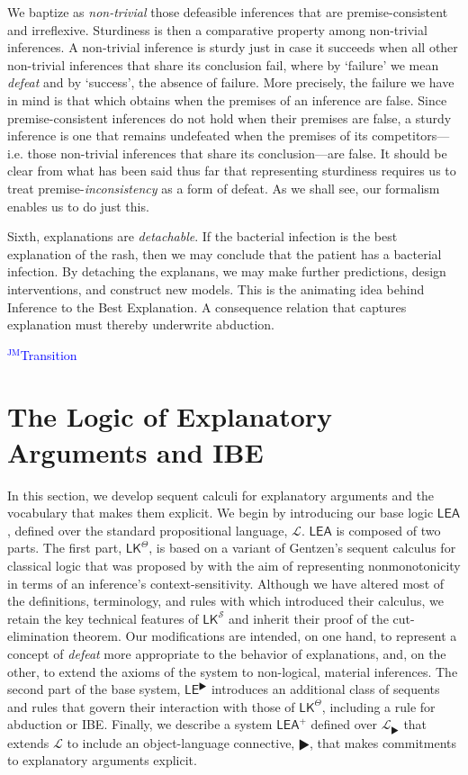 \documentclass{article}
\theoremstyle{definition}
\theoremstyle{definition}
\theoremstyle{definition}
\theoremstyle{definition}
\theoremstyle{remark}
\theoremstyle{definition}
\theoremstyle{definition}
\newcommand{\jm}[1]{\textcolor{blue}{$^{\textrm{JM}}${#1}}}
\begin{document}
We baptize as \textit{non-trivial} those defeasible inferences that are premise-consistent and irreflexive. Sturdiness is then a comparative property among non-trivial inferences. A non-trivial inference is sturdy just in case it succeeds when all other non-trivial inferences that share its conclusion fail, where by `failure' we mean \textit{defeat} and by `success', the absence of failure. More precisely, the failure we have in mind is that which obtains when the premises of an inference are false. Since  premise-consistent inferences do not hold when their premises are false, a sturdy inference is one that remains undefeated when the premises of its competitors---i.e. those non-trivial inferences that share its conclusion---are false. It should be clear from what has been said thus far that representing sturdiness requires us to treat premise-\textit{inconsistency} as a form of defeat. As we shall see, our formalism enables us to do just this.

Sixth, explanations are \textit{detachable}. If the bacterial infection is the best explanation of the rash, then we may conclude that the patient has a bacterial infection. By detaching the explanans, we may make further predictions, design interventions, and construct new models. This is the animating idea behind Inference to the Best Explanation. A consequence relation that captures explanation must thereby underwrite abduction. 

\jm{Transition}

\section{The Logic of Explanatory Arguments and IBE}

In this section, we develop sequent calculi for explanatory arguments and the vocabulary that makes them explicit. We begin by introducing our base logic  $ \mathsf{LEA}$, defined over the standard propositional language, $ \mathcal{L} $. $ \mathsf{LEA}$ is composed of two parts. The first part, $ \mathsf{LK^\Theta}$, is based on a variant of Gentzen's sequent calculus for classical logic that was proposed by \textcite{Piazza2015} with the aim of representing nonmonotonicity in terms of an inference's context-sensitivity. Although we have altered most of the definitions, terminology, and rules with which \textcite{Piazza2015} introduced their calculus, we retain the key technical features of $ \mathsf{LK}^{\mathcal{S}}$ and inherit their proof of the cut-elimination theorem. Our modifications are intended, on one hand, to represent a concept of \textit{defeat} more appropriate to the behavior of explanations, and, on the other, to extend the axioms of the system to non-logical, material inferences. The second part of the base system, $ \mathsf{LE^\RHD}$ introduces an additional class of sequents and rules that govern their interaction with those of $ \mathsf{LK^\Theta}$, including a rule for abduction or IBE. Finally, we describe a system $ \mathsf{LEA^+}$ defined over  $ \mathcal{L}_{\RHD} $ that extends $ \mathcal{L} $ to include an object-language connective, $ \RHD $, that makes commitments to explanatory arguments explicit. 
\end{document}
